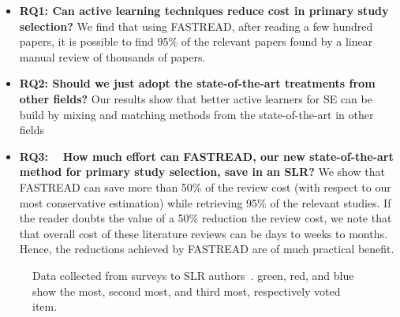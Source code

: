 \documentclass{svjour3}
\theoremstyle{break}
\newcommand{\respto}[1]{
\fcolorbox{black}{black!15}{
\label{response:#1}
\bf
  \scriptsize R-{#1}}~
}
\begin{document}
\begin{itemize}


\item
{\bf RQ1: Can active learning techniques reduce cost in primary study selection?}  We find that using FASTREAD,  after reading a few hundred papers,  it is possible
to find   95\% of the relevant papers found by a linear
manual review of thousands of papers.   
\item
{\bf RQ2: Should we just adopt the state-of-the-art treatments from other fields?} Our results show that better active learners
for SE can be build by  mixing and matching methods
from the state-of-the-art in other fields
\item
{\bf RQ3: \respto{0d}How much effort can FASTREAD, our new state-of-the-art method for primary study selection, save in an SLR?} We show that FASTREAD can save more than 50\% of the review cost (with respect to our most conservative estimation) while retrieving 95\% of the   relevant  studies.  If the reader doubts the value of a 50\% reduction the review cost, we note that that overall cost of these literature reviews can be days to weeks to months. Hence, the reductions achieved by FASTREAD are of much practical benefit.



\end{itemize}



\begin{figure}[!b]
    \centering
    \caption{Data collected from surveys to SLR authors~\cite{carver2013identifying}. {\setlength{\fboxsep}{1pt}\colorbox{green!40}{green}}, {\setlength{\fboxsep}{1pt}\colorbox{red!30}{red}}, and {\setlength{\fboxsep}{1pt}\colorbox{blue!50}{blue}} show the most,   second most, and third most, respectively voted item.}
    \label{fig:barrier}
\end{figure}
\end{document}
